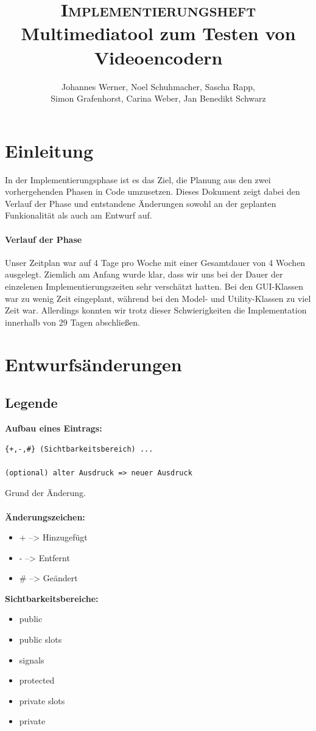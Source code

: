 \documentclass{scrartcl}
\title{\fontsize{40}{48} \selectfont \textsc{Implementierungsheft}\\
{\fontsize{18}{18} \selectfont Multimediatool zum Testen von Videoencodern}}
\author {Johannes Werner, Noel Schuhmacher, Sascha Rapp,\\ Simon Grafenhorst,
Carina Weber, Jan Benedikt Schwarz}
\begin{document}
 {
\pagestyle{empty}
\maketitle
\newpage
{}
\tableofcontents
\clearpage
\pagestyle{plain}
\newpage
\section{Einleitung}
In der Implementierungsphase ist es das Ziel, die Planung aus den zwei vorhergehenden Phasen in Code umzusetzen.  Dieses Dokument zeigt dabei den Verlauf der Phase und entstandene Änderungen sowohl an der geplanten Funkionalität als auch am Entwurf auf.

\paragraph{Verlauf der Phase} Unser Zeitplan war auf 4 Tage pro Woche mit einer Gesamtdauer von 4 Wochen ausgelegt. Ziemlich am Anfang wurde klar, dass wir uns bei der Dauer der einzelenen Implementierungszeiten sehr verschätzt hatten. Bei den GUI-Klassen war zu wenig Zeit eingeplant, während bei den Model- und Utility-Klassen zu viel Zeit war. Allerdings konnten wir trotz dieser Schwierigkeiten die Implementation innerhalb von 29 Tagen abschließen.
\newpage
\section{Entwurfsänderungen}
\subsection{Legende}
\bigskip
\textbf{Aufbau eines Eintrags:}
\begin{verbatim}
{+,-,#} (Sichtbarkeitsbereich) ...

(optional) alter Ausdruck => neuer Ausdruck
\end{verbatim}
Grund der Änderung.\\
\\
\bigskip
\textbf{Änderungszeichen:}
\begin{itemize}
\item[] + \hspace{5mm}-->\hspace{5mm} Hinzugefügt
\item[] -  \hspace{5mm}-->\hspace{5mm} Entfernt
\item[] \# \hspace{5mm}-->\hspace{5mm} Geändert
\end{itemize}
\bigskip
\textbf{Sichtbarkeitsbereiche:}
\begin{itemize}
\item public
\item public slots
\item signals
\item protected
\item private slots
\item private
\end{itemize}
\newpage
}
\end{document}
